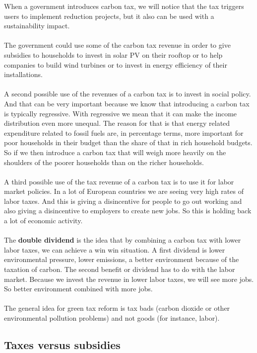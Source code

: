 \documentclass[../summary.tex]{subfiles}
\begin{document}
	  When a government introduces carbon tax, we will notice that the tax triggers users to implement reduction projects, but it also can be used with a sustainability impact. 
	  \\\\
	  The government could use some of the carbon tax revenue in order to give subsidies to households to invest in solar PV on their rooftop or to help companies to build wind turbines or to invest in energy efficiency of their installations. 
	  \\\\
	  A second possible use of the revenues of a carbon tax is to invest in social policy. And that can be very important because we know that introducing a carbon tax is typically regressive. With regressive we mean that it can make the income distribution even more unequal. The reason for that is that energy related expenditure related to fossil fuels are, in percentage terms, more important for poor households in their budget than the share of that in rich household budgets. So if we then introduce a carbon tax that will weigh more heavily on the shoulders of the poorer households than on the richer households. 
	  \\\\
	  A third possible use of the tax revenue of a carbon tax is to use it for labor market policies. In a lot of European countries we are seeing very high rates of labor taxes. And this is giving a disincentive for people to go out working and also giving a disincentive to employers to create new jobs. So this is holding back a lot of economic activity.
	  \\\\
	  The \textbf{double dividend} is the idea that by combining a carbon tax with lower labor taxes, we can achieve a win win situation. A first dividend is lower environmental pressure, lower emissions, a better environment because of the taxation of carbon. The second benefit or dividend has to do with the labor market. Because we invest the revenue in lower labor taxes, we will see more jobs. So better environment combined with more jobs.
	  \\\\
	  The general idea for green tax reform is tax bads (carbon dioxide or other environmental pollution problems) and not goods (for instance, labor).
	  \newpage
	  \subsection{Taxes versus subsidies}
	  
\end{document}

